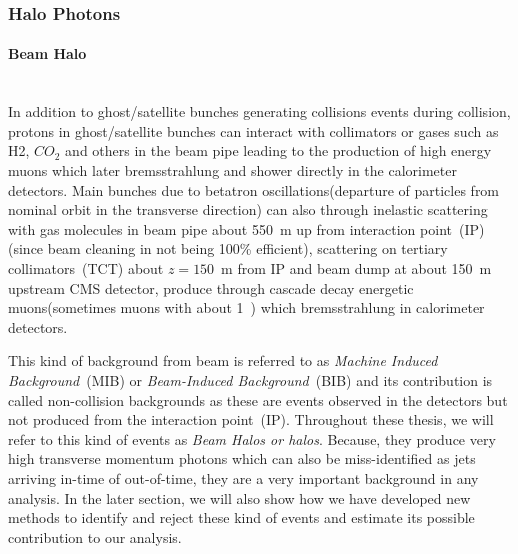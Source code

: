 \subsubsection{Halo Photons}
\paragraph*{Beam Halo}\mbox{}\\
In addition to ghost/satellite bunches generating collisions events during collision, protons in ghost/satellite bunches can interact with collimators or gases such as H2, $CO_{2}$ and others in the beam pipe leading to the production of high energy muons which later bremsstrahlung and shower directly in the calorimeter detectors. 
Main bunches due to betatron oscillations(departure of particles from nominal orbit in the transverse direction) can also through inelastic scattering with gas molecules in beam pipe about 550~m up from interaction  point~(IP)(since beam cleaning in not being 100\% efficient), scattering on tertiary collimators~(TCT) about $z = 150$~m from IP and beam dump at about 150~m upstream CMS detector, produce through cascade decay energetic muons(sometimes muons with about 1~\TeV) which bremsstrahlung in calorimeter detectors. 

This kind of background from beam is referred to as \textit{Machine Induced Background}~(MIB) or \textit{Beam-Induced Background}~(BIB) and its contribution is called non-collision backgrounds as these are events observed in the detectors but not produced from the interaction point~(IP). Throughout these thesis, we will refer to this kind of events as \textit{Beam Halos or halos}. Because, they produce very high transverse momentum photons which can also be miss-identified as jets arriving in-time of out-of-time, they are a very important background in any analysis. In the later section, we will also show how we have developed new methods to identify and reject these kind of events and estimate its possible contribution to our analysis.


